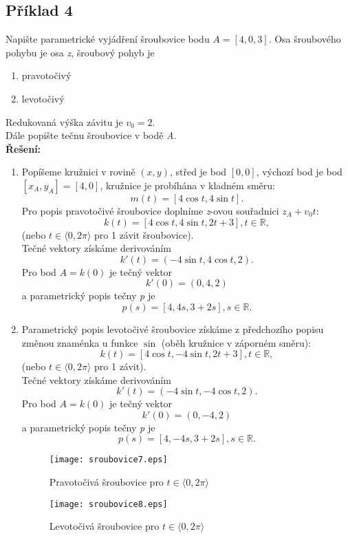 \subsection*{Příklad 4}
Napište parametrické vyjádření šroubovice bodu $A=[4,0,3]$. Osa šroubového pohybu je osa \textit{z},
šroubový pohyb je
\begin{enumerate}
	\item pravotočivý
	\item levotočivý
\end{enumerate}
Redukovaná výška závitu je $v_0=2$. \\
Dále popište tečnu šroubovice v bodě \textit{A}. \\[10pt]
\textbf{Řešení: } 
\begin{enumerate}
	\item Popíšeme kružnici v rovině $(x,y)$, střed je bod $[0,0]$, výchozí bod je bod $[x_A, y_A]=[4,0]$, kružnice je probíhána v kladném směru:
	      $$m(t) = \left[4\cos{t}, 4\sin{t}\right].$$
	      Pro popis pravotočivé šroubovice doplníme \textit{z}-ovou souřadnici $z_A+v_0t$:
	      $$k(t) = \left[4\cos{t}, 4\sin{t}, 2t+3\right], t \in \mathbb{R},$$
	      (nebo $t \in \langle0, 2\pi\rangle$ pro 1 závit šroubovice). \\
	      Tečné vektory získáme derivováním
	      $$k'(t)=(-4\sin{t}, 4\cos{t}, 2).$$
	      Pro bod $A=k(0)$ je tečný vektor
	      $$k'(0)=(0,4,2)$$
	      a parametrický popis tečny \textit{p} je
	      $$p(s)=[4,4s,3+2s], s \in \mathbb{R}.$$
	\item Parametrický popis levotočivé šroubovice získáme z předchozího popisu změnou znaménka u funkce $\sin$ (oběh kružnice v záporném směru):
	      $$k(t) = \left[4\cos{t}, -4\sin{t}, 2t+3\right], t \in \mathbb{R},$$
	      (nebo $t \in \langle0, 2\pi\rangle$ pro 1 závit). 	\\
	      Tečné vektory získáme derivováním
	      $$k'(t)=(-4\sin{t}, -4\cos{t}, 2).$$
	      Pro bod $A=k(0)$ je tečný vektor
	      $$k'(0)=(0,-4,2)$$
	      a parametrický popis tečny \textit{p} je
	      $$p(s)=[4,-4s,3+2s], s \in \mathbb{R}.$$
	      \begin{figure}[H]
	      	\centering
	      	\texttt{[image: sroubovice7.eps]}
	      	\caption{Pravotočivá šroubovice pro $t \in \langle0, 2\pi\rangle$}
	      \end{figure}	 	
	      \begin{figure}[H]
	      	\centering
	      	\texttt{[image: sroubovice8.eps]}
	      	\caption{Levotočivá šroubovice pro $t \in \langle0, 2\pi\rangle$}
	      	
	      \end{figure}	 	
\end{enumerate}
\clearpage

